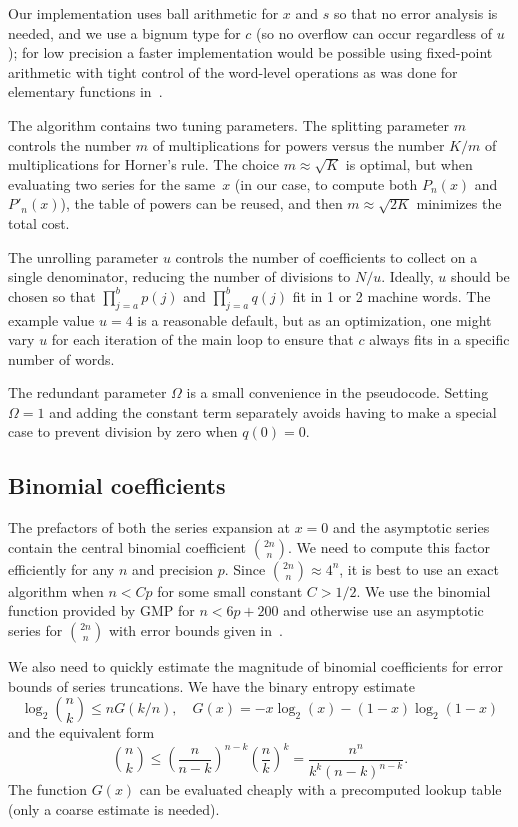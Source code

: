 \documentclass[11pt,a4paper]{article}
\begin{document}
Our implementation uses ball arithmetic for $x$ and $s$
so that no error analysis is needed, and we use a bignum type for $c$ (so
no overflow can occur regardless of $u$);
for low precision a faster implementation
would be possible using fixed-point arithmetic with tight
control of the word-level operations
as was done for elementary functions in~\cite{Johansson2015elementary}.

The algorithm contains two tuning parameters.
The splitting parameter $m$ controls the
number $m$ of multiplications for powers versus the number $K / m$ of
multiplications for Horner's rule.
The choice $m \approx \sqrt K$ is optimal,
but when evaluating two series for the same~$x$
(in our case, to compute both $P_n(x)$ and $P'_n(x)$),
the table of powers can be reused,
and then $m \approx \sqrt{2K}$ minimizes the total cost.

The unrolling parameter $u$ controls the number of coefficients
to collect on a single denominator, reducing the
number of divisions to $N / u$.
Ideally, $u$ should be chosen
so that $\prod_{j=a}^b p(j)$
and $\prod_{j=a}^b q(j)$ fit in 1 or 2 machine words.
The example value $u = 4$ is a reasonable
default, but as an optimization, one might vary $u$
for each iteration of the main loop
to ensure that $c$ always fits in a specific number of words.

The redundant parameter $\Omega$ is a small convenience in the pseudocode.
Setting $\Omega = 1$ and adding the constant term separately
avoids having to make a special case to prevent division by zero
when $q(0) = 0$.

\subsection{Binomial coefficients}

The prefactors of both the series expansion at $x = 0$ and the asymptotic series
contain the central binomial coefficient ${2n \choose n}$.
We need to compute this factor efficiently for any $n$ and precision $p$.
Since ${2n \choose n} \approx 4^n$, it is best to use
an exact algorithm when $n < Cp$ for some small constant $C > 1/2$.
We use the binomial function provided by GMP for $n < 6p + 200$
and otherwise use an asymptotic series for ${2n \choose n}$
with error bounds given in~\cite{brent2016asymptotic}.

We also need to quickly estimate the magnitude of binomial coefficients
for error bounds of series truncations.
We have the binary entropy estimate
$$\log_2 {n \choose k} \le n G(k/n), \quad G(x) = -x \log_2(x) - (1-x) \log_2(1-x)$$
and the equivalent form
\begin{equation}
\label{eq:binbound}
{n \choose k} \le \left(\frac{n}{n-k}\right)^{n-k} \left(\frac{n}{k}\right)^k = \frac{n^n}{k^k (n-k)^{n-k}}.
\end{equation}
The function $G(x)$ can be evaluated cheaply with a precomputed
lookup table (only a coarse estimate is needed).
\end{document}
